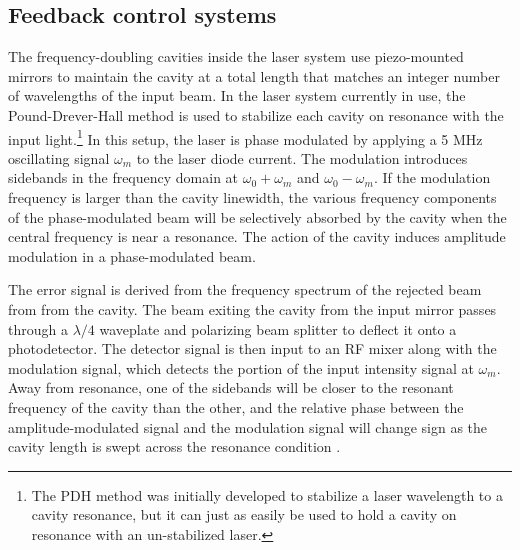 \documentclass [10pt, twoside] {uwthesis}[2012/04/02]
\begin{document}
\subsection{Feedback control systems}
The frequency-doubling cavities inside the laser system use piezo-mounted mirrors to maintain the cavity at a total length that matches an integer number of wavelengths of the input beam. In the laser system currently in use, the Pound-Drever-Hall method is used to stabilize each cavity on resonance with the input light.\footnote{The PDH method was initially developed to stabilize a laser wavelength to a cavity resonance, but it can just as easily be used to hold a cavity on resonance with an un-stabilized laser.} In this setup, the laser is phase modulated by applying a 5 MHz oscillating signal $\omega_m$ to the laser diode current. The modulation introduces sidebands in the frequency domain at $\omega_0 + \omega_m$ and $\omega_0 - \omega_m$. If the modulation frequency is larger than the cavity linewidth, the various frequency components of the phase-modulated beam will be selectively absorbed by the cavity when the central frequency is near a resonance. The action of the cavity induces amplitude modulation in a phase-modulated beam.

The error signal is derived from the frequency spectrum of the rejected beam from from the cavity. The beam exiting the cavity from the input mirror passes through a $\lambda/4$ waveplate and polarizing beam splitter to deflect it onto a photodetector. The detector signal is then input to an RF mixer along with the modulation signal, which detects the portion of the input intensity signal at $\omega_m$. Away from resonance, one of the sidebands will be closer to the resonant frequency of the cavity than the other, and the relative phase between the amplitude-modulated signal and the modulation signal will change sign as the cavity length is swept across the resonance condition \cite{Nagourney}. 
\end{document}
